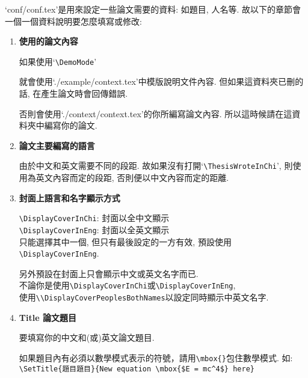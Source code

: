 
`conf/conf.tex'是用來設定一些論文需要的資料: 如題目, 人名等. 故以下的章節會一個一個資料說明要怎麼填寫或修改:

\begin{enumerate}
  \item
  {
    \textbf{使用的論文內容}

    如果使用`\verb|\DemoMode|'

    就會使用`./example/context.tex'中模版說明文件內容. 但如果這資料夾已刪的話, 在產生論文時會回傳錯誤.

    否則會使用`./context/context.tex'的你所編寫論文內容. 所以這時候請在這資料夾中編寫你的論文.
  } %

  \item
  {
    \textbf{論文主要編寫的語言}

    由於中文和英文需要不同的段距. 故如果沒有打開`\verb|\ThesisWroteInChi|', 則使用為英文內容而定的段距, 否則便以中文內容而定的距離.
  } %

  \item
  {
    \textbf{封面上語言和名字顯示方式}

    \verb|\DisplayCoverInChi|:  封面以全中文顯示\\
    \verb|\DisplayCoverInEng|:  封面以全英文顯示\\
    只能選擇其中一個, 但只有最後設定的一方有效, 預設使用\verb|\DisplayCoverInEng|.

    另外預設在封面上只會顯示中文或英文名字而已.\\
    不論你是使用\verb|\DisplayCoverInChi|或\verb|\DisplayCoverInEng|,\\
    使用\verb|\\DisplayCoverPeoplesBothNames|以設定同時顯示中英文名字.
  } %

  \item
  {
    \textbf{Title 論文題目}

    要填寫你的中文和(或)英文論文題目.

    如果題目內有必須以數學模式表示的符號，請用\verb|\mbox{}|包住數學模式. 如:\\
    \verb|\SetTitle{題目題目}{New equation \mbox{$E = mc^4$} here}|\\

}
\end{enumerate}
